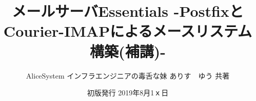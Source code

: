 \title{メールサーバEssentials -PostfixとCourier-IMAPによるメースリステム構築(補講)-}
\author{AliceSystem インフラエンジニアの毒舌な妹 ありす　ゆう 共著}
\date{初版発行 2019年8月1ｘ日}